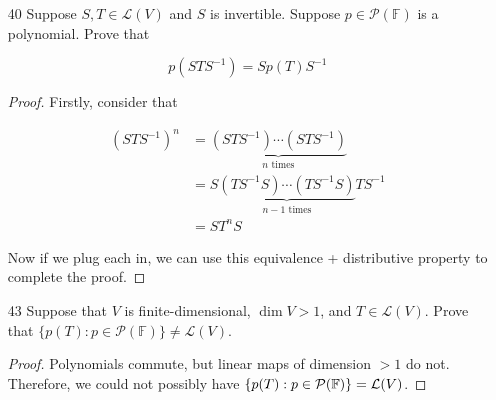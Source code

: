 \begin{enumerate}
\begin{proof}
Suppose that $V$ has an eigenvalue, $\lambda \ne 0$, with an associated eigenvector, $v_1$. Extend $v_1$ to a basis of $V$, $v_1, \dots, v_n$. Now consider the subspace generated from $v_2, \dots, v_n$, $U$. Suppose that $U$ was not invariant. Then exists some $v = a_2v_2 + \dots + a_nv_n$ such that $Tv = v_1$. But we also know that $T(\frac 1\lambda v_1) = v_1$, and we also know that $T$ is injective from the fact that $\dim \operatorname{null} T = 0$, so we have a contradiction. 
\end{proof}

\item[40] Suppose $S, T \in \mathcal L(V)$ and $S$ is invertible. Suppose $p \in \mathcal P(\mathbb F)$ is a polynomial. Prove that 

$$p(STS^{-1}) = Sp(T)S^{-1}$$

\begin{proof}
Firstly, consider that 

\begin{align*}
(STS^{-1})^n &=\underbrace{(STS^{-1})\cdots(STS^{-1})}_{n \text{ times}} \\
&=S\underbrace{(TS^{-1}S)\cdots(TS^{-1}S)}_{n - 1 \text{ times}} TS^{-1} \\ 
&=ST^nS
\end{align*}


Now if we plug each in, we can use this equivalence + distributive property to complete the proof.
\end{proof}

\item[43] Suppose that $V$ is finite-dimensional, $\dim V > 1$, and $T \in \mathcal L(V)$. Prove that $\{p(T): p \in \mathcal P(\mathbb F)\} \ne \mathcal L(V)$.


\begin{proof}
Polynomials commute, but linear maps of dimension $> 1$ do not. Therefore, we could not possibly have $\{p(T): p \in \mathcal P(\mathbb{F})\} = \mathcal L(V)$.
\end{proof}
\end{enumerate}